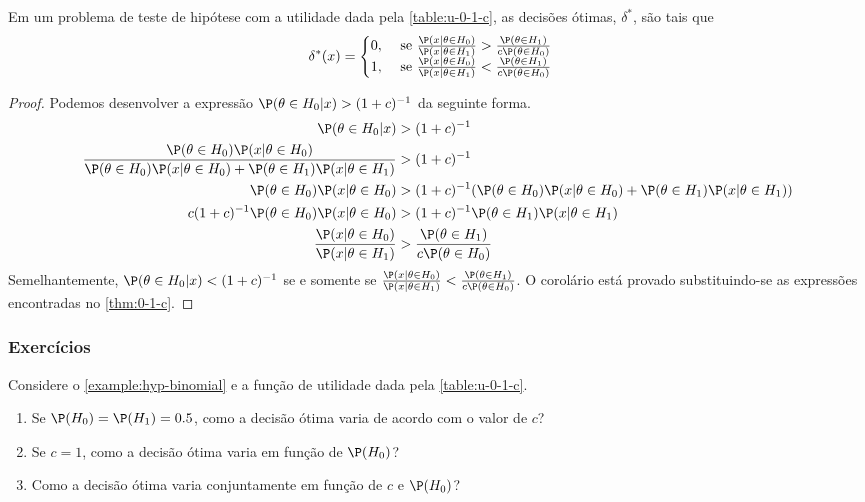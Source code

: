\begin{corollary}
 \label{cor:0-1-c}
 Em um problema de teste de hipótese com 
 a utilidade dada pela \cref{table:u-0-1-c},
 as decisões ótimas, $\delta^{*}$, são tais que
 \begin{align*}
  \delta^{*}(x)	&=
  \begin{cases}
   0, & \text{ se } 
   \frac{\P(x|\theta \in H_{0})}{\P(x|\theta \in H_{1})}	
   > \frac{\P(\theta \in H_{1})}{c\P(\theta \in H_{0})} \\
   1, & \text{ se } 
   \frac{\P(x|\theta \in H_{0})}{\P(x|\theta \in H_{1})}
   < \frac{\P(\theta \in H_{1})}{c\P(\theta \in H_{0})}
  \end{cases}
 \end{align*}
\end{corollary}

\begin{proof}
 Podemos desenvolver a expressão 
 $\P(\theta \in H_{0}|x) > (1+c)^{-1}$ 
 da seguinte forma.
 \begin{align*}
  \P(\theta \in H_{0}|x) &> (1+c)^{-1}	\\
  \frac{\P(\theta \in H_{0})\P(x|\theta \in H_{0})}
  {\P(\theta \in H_{0})\P(x|\theta \in H_{0}) 
  +\P(\theta \in H_{1})\P(x|\theta \in H_{1})}
  &> (1+c)^{-1}	\\
  \P(\theta \in H_{0})\P(x|\theta \in H_{0})
  &> (1+c)^{-1}(\P(\theta \in H_{0})\P(x|\theta \in H_{0})
  +\P(\theta \in H_{1})\P(x|\theta \in H_{1})) \\
  c(1+c)^{-1}\P(\theta \in H_{0})\P(x|\theta \in H_{0})	
  &> (1+c)^{-1}\P(\theta \in H_{1})\P(x|\theta \in H_{1})\\
  \frac{\P(x|\theta \in H_{0})}{\P(x|\theta \in H_{1})}
  &> \frac{\P(\theta \in H_{1})}{c\P(\theta \in H_{0})}
 \end{align*}
 Semelhantemente, $\P(\theta \in H_{0}|x) < (1+c)^{-1}$ 
 se e somente se
 $\frac{\P(x|\theta \in H_{0})}{\P(x|\theta \in H_{1})} < \frac{\P(\theta \in H_{1})}{c\P(\theta \in H_{0})}$.
 O corolário está provado substituindo-se 
 as expressões encontradas no \cref{thm:0-1-c}.
\end{proof}

\subsubsection*{Exercícios}

\begin{exercise}
 Considere o \cref{example:hyp-binomial} e
 a função de utilidade dada pela \cref{table:u-0-1-c}.
 \begin{enumerate}[label=(\alph*)]
  \item Se $\P(H_{0})=\P(H_{1})=0.5$, 
  como a decisão ótima varia de acordo com 
  o valor de $c$?
  \item Se $c=1$, como a decisão ótima varia 
  em função de $\P(H_{0})$?
  \item Como a decisão ótima varia conjuntamente 
  em função de $c$ e $\P(H_{0})$?
 \end{enumerate}
\end{exercise}

